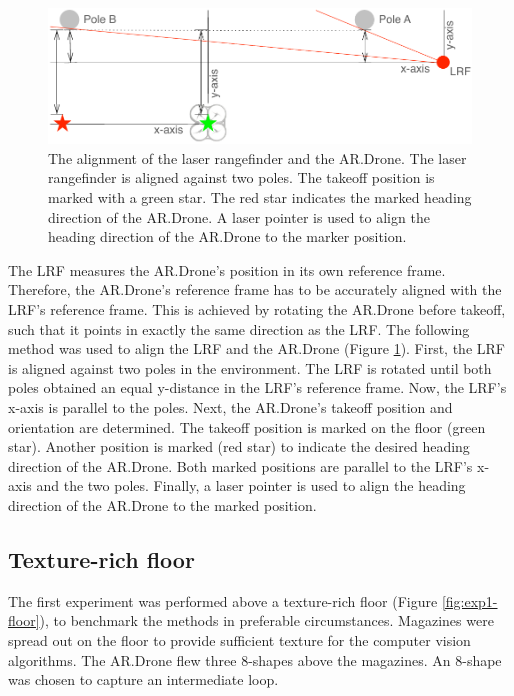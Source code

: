 \begin{figure}[htb]
\centering
\includegraphics[width=13cm]{images/exp1-floorplan-align.pdf}
\caption{The alignment of the laser rangefinder and the AR.Drone. The laser rangefinder is aligned against two poles. The takeoff position is marked with a green star. The red star indicates the marked heading direction of the AR.Drone. A laser pointer is used to align the heading direction of the AR.Drone to the marker position.}
\label{fig:exp1-floorplan-align}
\end{figure}

The LRF measures the AR.Drone's position in its own reference frame.
Therefore, the AR.Drone's reference frame has to be accurately aligned with the LRF's reference frame.
This is achieved by rotating the AR.Drone before takeoff, such that it points in exactly the same direction as the LRF.
The following method was used to align the LRF and the AR.Drone (Figure \ref{fig:exp1-floorplan-align}).
First, the LRF is aligned against two poles in the environment.
The LRF is rotated until both poles obtained an equal y-distance in the LRF's reference frame.
Now, the LRF's x-axis is parallel to the poles.
Next, the AR.Drone's takeoff position and orientation are determined.
The takeoff position is marked on the floor (green star).
Another position is marked (red star) to indicate the desired heading direction of the AR.Drone.
Both marked positions are parallel to the LRF's x-axis and the two poles.
Finally, a laser pointer is used to align the heading direction of the AR.Drone to the marked position.





\subsection{Texture-rich floor}
\label{sec:exp1-texture-rich}
The first experiment was performed above a texture-rich floor (Figure \ref{fig:exp1-floor}), to benchmark the methods in preferable circumstances.
Magazines were spread out on the floor to provide sufficient texture for the computer vision algorithms.
The AR.Drone flew three 8-shapes above the magazines.
An 8-shape was chosen to capture an intermediate loop.

